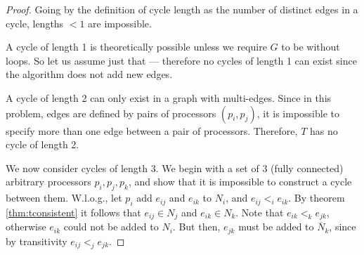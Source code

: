 \begin{proof}
Going by the definition of cycle length as the number of distinct edges in a
cycle, lengths $< 1$ are impossible.

A cycle of length 1 is theoretically possible unless we require $G$ to be
without loops. So let us assume just that --- therefore no cycles of length
1 can exist since the algorithm does not add new edges.

A cycle of length 2 can only exist in a graph with multi-edges. 
Since in this problem, edges are defined by pairs of processors $(p_i, p_j)$,
it is impossible to specify more than one edge between a pair of processors.
Therefore, $T$ has no cycle of length 2.

We now consider cycles of length 3. We begin with a set of 3 (fully connected)
arbitrary processors
$p_i, p_j, p_k$, and show that it is impossible to construct a cycle between them.
W.l.o.g., let $p_i$ add $e_{ij}$ and $e_{ik}$ to $N_i$, and $e_{ij} <_i e_{ik}$.
By theorem \ref{thm:tconsistent} it follows that $e_{ij} \in N_j$ and $e_{ik}
\in N_k$. Note that $e_{ik} <_k e_{jk}$, otherwise $e_{ik}$ could not be added
to $N_i$. But then, $e_{jk}$ must be added to $\overline{N}_k$, since
by transitivity $e_{ij} <_j e_{jk}$.
\end{proof}

